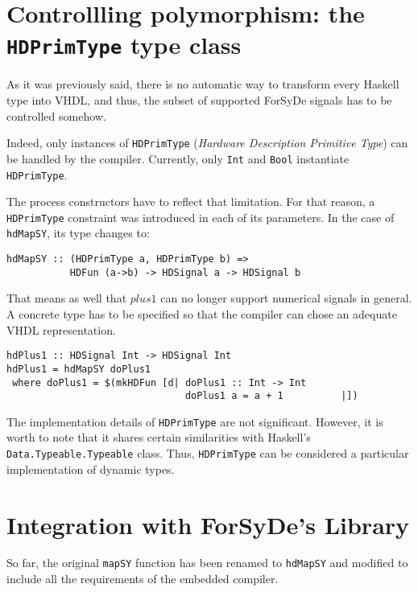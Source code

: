 \section{Controllling polymorphism: the \texttt{HDPrimType} type
  class}
\label{sec:polymorphism}

As it was previously said, there is no automatic way to transform
every Haskell type into VHDL, and thus, the subset of
supported ForSyDe signals has to be controlled somehow.

Indeed, only instances of \texttt{HDPrimType} (\textit{Hardware
  Description Primitive Type}) can be handled by the compiler.
Currently, only \texttt{Int} and \texttt{Bool} instantiate
\texttt{HDPrimType}.

The process constructors have to reflect that limitation. For that
reason, a \texttt{HDPrimType} constraint was introduced in each of
its parameters. In the case of \texttt{hdMapSY}, its type changes to:


\begin{lstlisting}
hdMapSY :: (HDPrimType a, HDPrimType b) => 
           HDFun (a->b) -> HDSignal a -> HDSignal b
\end{lstlisting}


That means as well that $\mathit{plus1}$ can no longer support numerical
signals in general. A concrete type has to be specified so that the
compiler can chose an adequate VHDL representation.

\begin{lstlisting}
hdPlus1 :: HDSignal Int -> HDSignal Int 
hdPlus1 = hdMapSY doPlus1
 where doPlus1 = $(mkHDFun [d| doPlus1 :: Int -> Int
                               doPlus1 a = a + 1          |])
\end{lstlisting}

The implementation details of \texttt{HDPrimType} are not significant.
However, it is worth to note that it shares certain similarities with
Haskell's \texttt{Data.\-Typeable.\-Typeable} class.  Thus,
\texttt{HDPrimType} can be considered a particular implementation of
dynamic types.

\section{Integration with ForSyDe's Library}

So far, the original \texttt{mapSY} function has been renamed to
\texttt{hdMapSY} and modified to include all the requirements of the
embedded compiler.

